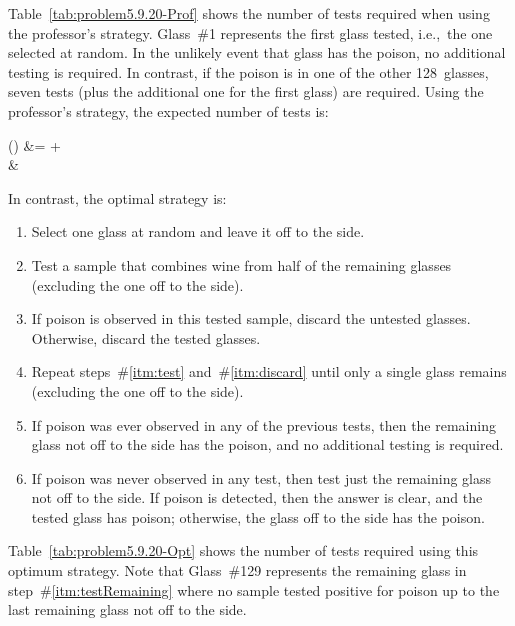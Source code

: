 Table~\ref{tab:problem5.9.20-Prof} shows the number of tests required when using the professor's strategy.  Glass~\#1 represents the first glass tested, i.e.,~the one selected at random.  In the unlikely event that glass has the poison, no additional testing is required. In contrast, if the poison is in one of the other 128~glasses, seven tests (plus the additional one for the first glass) are required.  Using the professor's strategy, the expected number of tests is:

\begin{aligncustom}
  () &=   +   \\
                                          &\approx {}
\end{aligncustom}


In contrast, the optimal strategy is:
\vspace{-1.25em}
\begin{enumerate}[leftmargin=1.35cm]
  \setlength\itemsep{0em}
  \item Select one glass at random and leave it off to the side.
  \item\label{itm:test} Test a sample that combines wine from half of the remaining glasses (excluding the one off to the side).
  \item\label{itm:discard} If poison is observed in this tested sample, discard the untested glasses.  Otherwise, discard the tested glasses.
  \item Repeat steps~\#\ref{itm:test} and~\#\ref{itm:discard} until only a single glass remains (excluding the one off to the side).
  \item If poison was ever observed in any of the previous tests, then the remaining glass not off to the side has the poison, and no additional testing is required.
  \item\label{itm:testRemaining} If poison was never observed in any test, then test just the remaining glass not off to the side. If poison is detected, then the answer is clear, and the tested glass has poison; otherwise, the glass off to the side has the poison.
\end{enumerate}

Table~\ref{tab:problem5.9.20-Opt} shows the number of tests required using this optimum strategy.    Note that Glass~\#129 represents the remaining glass in step~\#\ref{itm:testRemaining} where no sample tested positive for poison up to the last remaining glass not off to the side.

